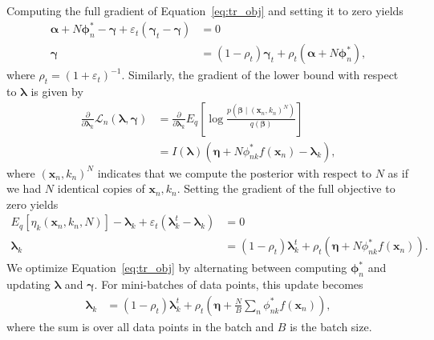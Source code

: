\documentclass[a4paper]{article}
\begin{document}
		Computing the full gradient of Equation~\ref{eq:tr_obj} and setting it to zero yields
		\begin{align}
			\bm{\alpha} + N \bm{\phi}_{n}^* - \bm{\gamma} + \varepsilon_t (\bm{\gamma}_t - \bm{\gamma}) &= 0 \\
			\bm{\gamma} &= (1 - \rho_t) \bm{\gamma}_t + \rho_t (\bm{\alpha} + N\bm{\phi}_n^*),
		\end{align}
		where $\rho_t = (1 + \varepsilon_t)^{-1}$. Similarly, the gradient of the lower bound with respect to $\bm{\lambda}$ is given by
		\begin{align}
			\frac{\partial}{\partial \bm{\lambda}_k} \mathcal{L}_n(\bm{\lambda}, \bm{\gamma})
			&= \frac{\partial}{\partial \bm{\lambda}_k} E_q\left[ \log \frac{p(\bm{\beta} \mid (\mathbf{x}_n, k_n)^N)}{q(\bm{\beta})} \right] \\
			&= I(\bm{\lambda}) (\bm{\eta} + N\phi^*_{nk} f(\mathbf{x}_n) - \bm{\lambda}_k),
		\end{align}
		where $(\mathbf{x}_n, k_n)^N$ indicates that we compute the posterior with respect to $N$ as if we had $N$ identical copies of $\mathbf{x}_n, k_n$.
		Setting the gradient of the full objective to zero yields
		\begin{align}
			E_q\left[ \eta_k(\mathbf{x}_n, k_n, N) \right] - \bm{\lambda}_k + \varepsilon_t (\bm{\lambda}_k^t - \bm{\lambda}_k) &= 0 \\
			\bm{\lambda}_k &= (1 - \rho_t) \bm{\lambda}_k^t + \rho_t \left( \bm{\eta} + N \phi^*_{nk} f(\mathbf{x}_n) \right).
		\end{align}
		We optimize Equation~\ref{eq:tr_obj} by alternating between computing $\bm{\phi}_n^*$ and updating $\bm{\lambda}$ and $\bm{\gamma}$.
		For mini-batches of data points, this update becomes
		\begin{align}
			\label{eq:tr_update}
			\bm{\lambda}_k &= (1 - \rho_t) \bm{\lambda}_k^t + \rho_t \left( \bm{\eta} + \frac{N}{B} \sum_n \phi^*_{nk} f(\mathbf{x}_n) \right),
		\end{align}
		where the sum is over all data points in the batch and $B$ is the batch size.
		
\end{document}
